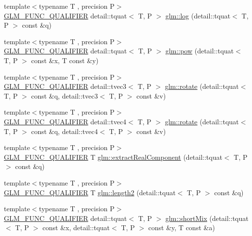 \begin{DoxyCompactItemize}
\item 
{\footnotesize template$<$typename T , precision P$>$ }\\\hyperlink{setup_8hpp_a33fdea6f91c5f834105f7415e2a64407}{G\+L\+M\+\_\+\+F\+U\+N\+C\+\_\+\+Q\+U\+A\+L\+I\+F\+I\+ER} detail\+::tquat$<$ T, P $>$ \hyperlink{group__gtx__quaternion_ga832e6b69f9e5f596cad8bada9ebb4477}{glm\+::log} (detail\+::tquat$<$ T, P $>$ const \&q)
\item 
{\footnotesize template$<$typename T , precision P$>$ }\\\hyperlink{setup_8hpp_a33fdea6f91c5f834105f7415e2a64407}{G\+L\+M\+\_\+\+F\+U\+N\+C\+\_\+\+Q\+U\+A\+L\+I\+F\+I\+ER} detail\+::tquat$<$ T, P $>$ \hyperlink{group__gtx__quaternion_ga9c9854d641f71f853cfed9dc5d4ef762}{glm\+::pow} (detail\+::tquat$<$ T, P $>$ const \&x, T const \&y)
\item 
{\footnotesize template$<$typename T , precision P$>$ }\\\hyperlink{setup_8hpp_a33fdea6f91c5f834105f7415e2a64407}{G\+L\+M\+\_\+\+F\+U\+N\+C\+\_\+\+Q\+U\+A\+L\+I\+F\+I\+ER} detail\+::tvec3$<$ T, P $>$ \hyperlink{group__gtx__quaternion_gaa4ac5806c1c001ac0247b1e1fd07dddf}{glm\+::rotate} (detail\+::tquat$<$ T, P $>$ const \&q, detail\+::tvec3$<$ T, P $>$ const \&v)
\item 
{\footnotesize template$<$typename T , precision P$>$ }\\\hyperlink{setup_8hpp_a33fdea6f91c5f834105f7415e2a64407}{G\+L\+M\+\_\+\+F\+U\+N\+C\+\_\+\+Q\+U\+A\+L\+I\+F\+I\+ER} detail\+::tvec4$<$ T, P $>$ \hyperlink{group__gtx__quaternion_ga3461e43b8c7da533b10bc5e9961add80}{glm\+::rotate} (detail\+::tquat$<$ T, P $>$ const \&q, detail\+::tvec4$<$ T, P $>$ const \&v)
\item 
{\footnotesize template$<$typename T , precision P$>$ }\\\hyperlink{setup_8hpp_a33fdea6f91c5f834105f7415e2a64407}{G\+L\+M\+\_\+\+F\+U\+N\+C\+\_\+\+Q\+U\+A\+L\+I\+F\+I\+ER} T \hyperlink{group__gtx__quaternion_gaad86e595f0021253cb9d34ca32f27f3c}{glm\+::extract\+Real\+Component} (detail\+::tquat$<$ T, P $>$ const \&q)
\item 
{\footnotesize template$<$typename T , precision P$>$ }\\\hyperlink{setup_8hpp_a33fdea6f91c5f834105f7415e2a64407}{G\+L\+M\+\_\+\+F\+U\+N\+C\+\_\+\+Q\+U\+A\+L\+I\+F\+I\+ER} T \hyperlink{group__gtx__quaternion_gaac8d704c7dfac92835109953b88f1c92}{glm\+::length2} (detail\+::tquat$<$ T, P $>$ const \&q)
\item 
{\footnotesize template$<$typename T , precision P$>$ }\\\hyperlink{setup_8hpp_a33fdea6f91c5f834105f7415e2a64407}{G\+L\+M\+\_\+\+F\+U\+N\+C\+\_\+\+Q\+U\+A\+L\+I\+F\+I\+ER} detail\+::tquat$<$ T, P $>$ \hyperlink{group__gtx__quaternion_ga297f92682708e59bda1849ca3aad0fea}{glm\+::short\+Mix} (detail\+::tquat$<$ T, P $>$ const \&x, detail\+::tquat$<$ T, P $>$ const \&y, T const \&a)

\end{DoxyCompactItemize}
